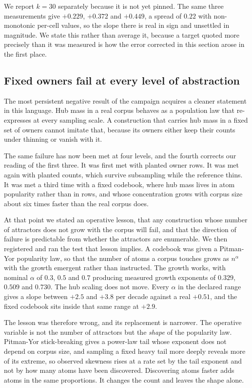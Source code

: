 \documentclass[11pt]{article}
\begin{document}
We report $k = 30$ separately because it is not yet pinned. The same three
measurements give $+0.229$, $+0.372$ and $+0.449$, a spread of $0.22$ with
non-monotonic per-cell values, so the slope there is real in sign and
unsettled in magnitude. We state this rather than average it, because a
target quoted more precisely than it was measured is how the error corrected
in this section arose in the first place.

\subsection{Fixed owners fail at every level of abstraction}

The most persistent negative result of the campaign acquires a cleaner
statement in this language. Hub mass in a real corpus behaves as a population
law that re-expresses at every sampling scale. A construction that carries
hub mass in a fixed set of owners cannot imitate that, because its owners
either keep their counts under thinning or vanish with it.

The same failure has now been met at four levels, and the fourth corrects
our reading of the first three. It was first met with planted owner rows. It
was met again with planted counts, which survive subsampling while the
reference thins. It was met a third time with a fixed codebook, where hub
mass lives in atom popularity rather than in rows, and whose concentration
grows with corpus size about six times faster than the real corpus does.

At that point we stated an operative lesson, that any construction whose
number of attractors does not grow with the corpus will fail, and that the
direction of failure is predictable from whether the attractors are
enumerable. We then registered and ran the test that lesson implies. A
codebook was given a Pitman-Yor popularity law, so that the number of atoms a
corpus touches grows as $n^{\alpha}$ with the growth emergent rather than
instructed. The growth works, with nominal $\alpha$ of $0.3$, $0.5$ and $0.7$
producing measured growth exponents of $0.329$, $0.509$ and $0.730$. The hub
scaling does not move. Every $\alpha$ in the declared range gives a slope
between $+2.5$ and $+3.8$ per decade against a real $+0.51$, and the fixed
codebook sits inside that same range at $+2.9$.

The lesson was therefore wrong, and its replacement is narrower. The
operative variable is not the number of attractors but the \emph{shape} of
the popularity law. Pitman-Yor stick-breaking gives a power-law tail whose
exponent does not depend on corpus size, and sampling a fixed heavy tail more
deeply reveals more of its extreme, so observed skewness rises at a rate set
by the tail exponent and not by how many atoms have been discovered.
Discovering atoms faster adds atoms in the same proportions. It changes the
count and leaves the shape alone.
\end{document}
